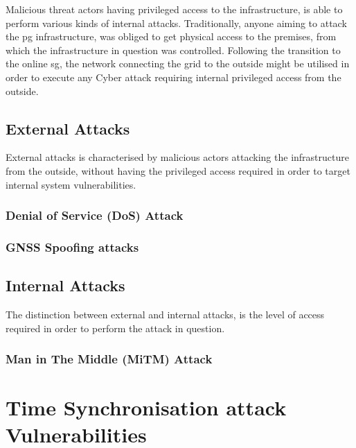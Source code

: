 Malicious threat actors having privileged access to the infrastructure, is able to perform various kinds of internal attacks. Traditionally, anyone aiming to attack the \acrlong{pg} infrastructure, was obliged to get physical access to the premises, from which the infrastructure in question was controlled. Following the transition to the online \acrshort{sg}, the network connecting the grid to the outside might be utilised in order to execute any Cyber attack requiring internal privileged access from the outside.


\subsection{External Attacks}
External attacks is characterised by malicious actors attacking the infrastructure from the outside, without having the privileged access required in order to target internal system vulnerabilities.




\subsubsection{Denial of Service (DoS) Attack}

\subsubsection{GNSS Spoofing attacks}

\subsection{Internal Attacks}
The distinction between external and internal attacks, is the level of access required in order to perform the attack in question.

\subsubsection{Man in The Middle (MiTM) Attack}


 \section{Time Synchronisation attack Vulnerabilities}












